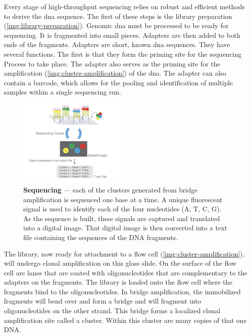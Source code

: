 Every stage of high-throughput sequencing relies on robust and efficient methods to derive the \gls{dna} sequence. The first of these steps is the library preparation (\autoref{img:library-preparation}). Genomic \gls{dna} must be processed to be ready for \gls{sequencing}. It is fragmented into small pieces. Adapters are then added to both ends of the fragments. Adapters are short, known \gls{dna} sequences. They have several functions. The first is that they form the priming site for the \gls{sequencing} Process to take place. The adapter also serves as the priming site for the amplification (\autoref{img:cluster-amplification}) of the \gls{dna}. The adapter can also contain a barcode, which allows for the pooling and identification of multiple samples within a single \gls{sequencing} run.

\begin{figure}
  \centering
  \includegraphics[width=0.48\textwidth]{resources/images/Sequencing.png}
  \caption{\textbf{Sequencing} \cite{Illumina2017-S} — each of the clusters generated from bridge amplification is sequenced one base at a time. A unique fluorescent signal is used to identify each of the four nucleotides (A, T, C, G). As the sequence is built, these signals are captured and translated into a digital image. That digital image is then converted into a text file containing the sequences of the DNA fragments.}
  \label{img:sequencing}
\end{figure}

The library, now ready for attachment to a flow cell (\autoref{img:cluster-amplification}), will undergo clonal amplification on this glass slide. On the surface of the flow cell are lanes that are coated with oligonucleotides that are complementary to the adapters on the fragments. The library is loaded onto the flow cell where the fragments bind to the oligonucleotides. In bridge amplification, the immobilized fragments will bend over and form a bridge and will fragment into oligonucleotides on the other strand. This bridge forms a localized clonal amplification site called a cluster. Within this cluster are many copies of that one DNA.



